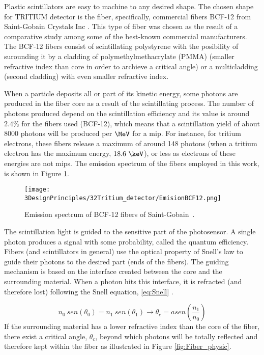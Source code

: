 Plastic scintillators are easy to machine to any desired shape. The chosen shape for TRITIUM detector is the fiber, specifically, commercial fibers BCF-12 from Saint-Gobain Crystals Inc \cite{DataSheetBCF12Fiber}. This type of fiber was chosen as the result of a comparative study \cite{TFGAlberto} among some of the best-known commercial manufacturers. The BCF-12 fibers consist of scintillating polystyrene with the posibility of surounding it by a cladding of polymethylmethacrylate (PMMA) (smaller refractive index than core in order to archieve a critical angle) or a multicladding (second cladding) with even smaller refractive index.

When a particle deposits all or part of its kinetic energy, some photons are produced in the fiber core as a result of the scintillating process. The number of photons produced depend on the scintillation efficiency and its value is around $2.4\%$ for the fibers used (BCF-12), which means that a scintillation yield of about $8000$ photons will be produced per $\MeV$ for a mip. For instance, for tritium electrons, these fibers release a maximum of around 148 photons (when a tritium electron has the maximum energy, $18.6~\keV$), or less as electrons of these energies are not mips. The emission spectrum of the fibers employed in this work, is shown in Figure \ref{fig:EmissionSpectrumFibers}.

\begin{figure}[htbp]
\centering
\texttt{[image: 3DesignPrinciples/32Tritium\_detector/EmisionBCF12.png]}
\caption{Emission spectrum of BCF-12 fibers of Saint-Gobain\label{fig:EmissionSpectrumFibers}~\cite{DataSheetBCF12Fiber}.}
\end{figure}

The scintillation light is guided to the sensitive part of the photosensor. A single photon produces a signal with some probability, called the quantum efficiency. Fibers (and scintillators in general) use the optical property of Snell's law \cite{Snell} to guide their photons to the desired part (ends of the fibers). The guiding mechanism is based on the interface created between the core and the surrounding material. When a photon hits this interface, it is refracted (and therefore lost) following the Snell equation, \ref{eq:Snell} \cite{Snell}. 

\begin{equation}
n_0~sen(\theta_0) = n_1~sen(\theta_1) \longrightarrow \theta_c = asen\left(\frac{n_1}{n_0} \right)
\label{eq:Snell}
\end{equation}
If the surrounding material has a lower refractive index than the core of the fiber, there exist a critical angle, $\theta_c$, beyond which photons will be totally reflected and therefore kept within the fiber as illustrated in Figure \ref{fig:Fiber_physic}.

